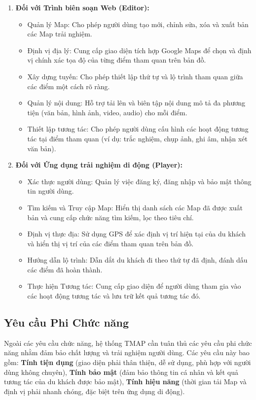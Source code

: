 \begin{enumerate}
    \item \textbf{Đối với Trình biên soạn Web (Editor):}
    \begin{itemize}
        \item Quản lý Map: Cho phép người dùng tạo mới, chỉnh sửa, xóa và xuất bản các Map trải nghiệm.
        \item Định vị địa lý: Cung cấp giao diện tích hợp Google Maps để chọn và định vị chính xác tọa độ của từng điểm tham quan trên bản đồ.
        \item Xây dựng tuyến: Cho phép thiết lập thứ tự và lộ trình tham quan giữa các điểm một cách rõ ràng.
        \item Quản lý nội dung: Hỗ trợ tải lên và biên tập nội dung mô tả đa phương tiện (văn bản, hình ảnh, video, audio) cho mỗi điểm.
        \item Thiết lập tương tác: Cho phép người dùng cấu hình các hoạt động tương tác tại điểm tham quan (ví dụ: trắc nghiệm, chụp ảnh, ghi âm, nhận xét văn bản).
    \end{itemize}

    \item \textbf{Đối với Ứng dụng trải nghiệm di động (Player):}
    \begin{itemize}
        \item Xác thực người dùng: Quản lý việc đăng ký, đăng nhập và bảo mật thông tin người dùng.
        \item Tìm kiếm và Truy cập Map: Hiển thị danh sách các Map đã được xuất bản và cung cấp chức năng tìm kiếm, lọc theo tiêu chí.
        \item Định vị thực địa: Sử dụng GPS để xác định vị trí hiện tại của du khách và hiển thị vị trí của các điểm tham quan trên bản đồ.
        \item Hướng dẫn lộ trình: Dẫn dắt du khách đi theo thứ tự đã định, đánh dấu các điểm đã hoàn thành.
        \item Thực hiện Tương tác: Cung cấp giao diện để người dùng tham gia vào các hoạt động tương tác và lưu trữ kết quả tương tác đó.
    \end{itemize}
\end{enumerate}

\subsection{Yêu cầu Phi Chức năng}

Ngoài các yêu cầu chức năng, hệ thống TMAP cần tuân thủ các yêu cầu phi chức năng nhằm đảm bảo chất lượng và trải nghiệm người dùng. Các yêu cầu này bao gồm: \textbf{Tính tiện dụng} (giao diện phải thân thiện, dễ sử dụng, phù hợp với người dùng không chuyên), \textbf{Tính bảo mật} (đảm bảo thông tin cá nhân và kết quả tương tác của du khách được bảo mật), \textbf{Tính hiệu năng} (thời gian tải Map và định vị phải nhanh chóng, đặc biệt trên ứng dụng di động). 


